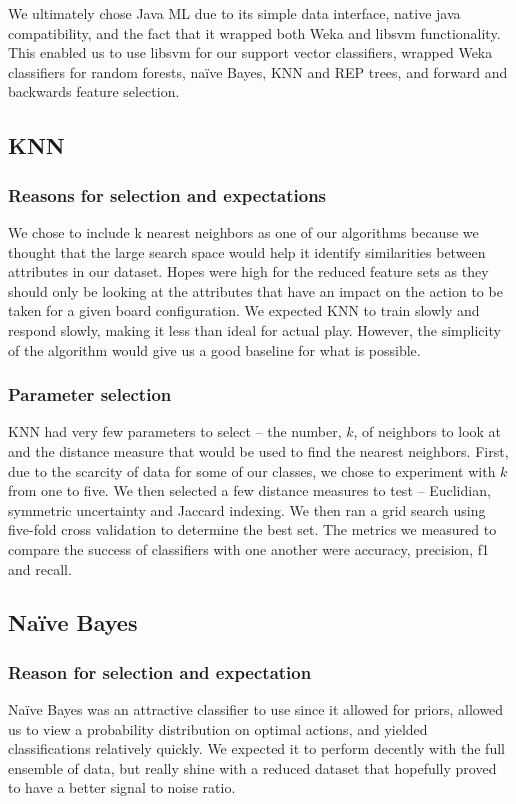 \documentclass[]{article}   %
\begin{document}
We ultimately chose Java ML due to its simple data interface, native java compatibility, and the fact that it wrapped both Weka and libsvm functionality. This enabled us to use libsvm for our support vector classifiers, wrapped Weka classifiers for random forests, na\"{i}ve Bayes, KNN and REP trees, and forward and backwards feature selection. 

\subsection{KNN}
\subsubsection{Reasons for selection and expectations}
We chose to include k nearest neighbors as one of our algorithms because we thought that the large search space would help it identify similarities between attributes in our dataset. Hopes were high for the reduced feature sets as they should only be looking at the attributes that have an impact on the action to be taken for a given board configuration.  We expected KNN to train slowly and respond slowly, making it less than ideal for actual play. However, the simplicity of the algorithm would give us a good baseline for what is possible.

\subsubsection{Parameter selection}
KNN had very few parameters to select – the number, $k$, of neighbors to look at and the distance measure that would be used to find the nearest neighbors. First, due to the scarcity of data for some of our classes, we chose to experiment with $k$ from one to five. We then selected a few distance measures to test – Euclidian, symmetric uncertainty and Jaccard indexing. We then ran a grid search using five-fold cross validation to determine the best set. The metrics we measured to compare the success of classifiers with one another were accuracy, precision, f1 and recall. 


\subsection{Na\"{i}ve Bayes}
\subsubsection{Reason for selection and expectation}
Na\"{i}ve Bayes was an attractive classifier to use since it allowed for priors, allowed us to view a probability distribution on optimal actions, and yielded classifications relatively quickly. We expected it to perform decently with the full ensemble of data, but really shine with a reduced dataset that hopefully proved to have a better signal to noise ratio. 
\end{document}
